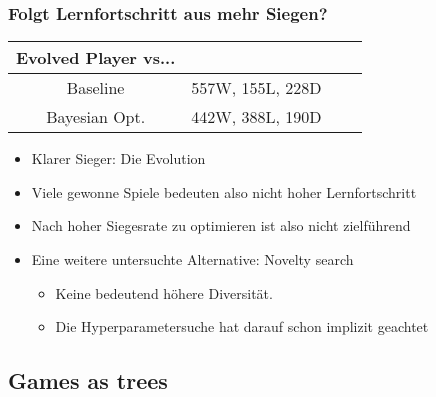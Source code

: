 \begin{frame}
 \frametitle{Folgt Lernfortschritt aus mehr Siegen?}
  


\pause
\begin{table} [H]
 \centering

  \begin{tabular}{ c c c c }
  \\
	Evolved Player vs...       &   \\
  \hline
  Baseline & 557W, 155L, 228D \\
  Bayesian Opt. & 442W, 388L, 190D  \\
  \end{tabular}

\end{table}

\begin{itemize}
  \item \pause Klarer Sieger: Die Evolution
  \item \pause Viele gewonne Spiele bedeuten also nicht hoher Lernfortschritt
  \item \pause Nach hoher Siegesrate zu optimieren ist also nicht zielführend
  \item \pause Eine weitere untersuchte Alternative: Novelty search
\begin{itemize}
  \item \pause Keine bedeutend höhere Diversität.
  \item \pause Die Hyperparametersuche hat darauf schon implizit geachtet
\end{itemize}
\end{itemize}

  
\end{frame}

\subsection{Games as trees}



